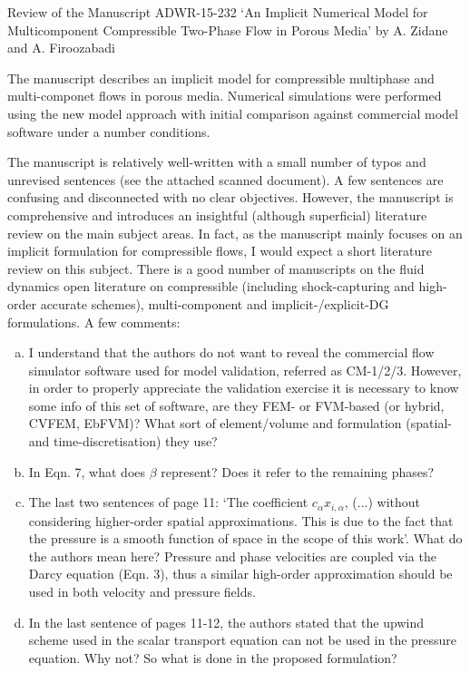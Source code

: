\documentclass[14pt,twoside]{report}
\begin{document}
{{\begin{center}
{\Large Review of the Manuscript ADWR-15-232 `An Implicit Numerical Model for Multicomponent Compressible Two-Phase Flow in Porous Media' by A. Zidane and A. Firoozabadi}
\end{center}

\medskip

The manuscript describes an implicit model for compressible multiphase and multi-componet flows in porous media. Numerical simulations were performed using the new model approach with initial comparison against commercial model software under a number conditions. 

The manuscript is relatively well-written with a small number of typos and unrevised sentences (see the attached scanned document). A few sentences are confusing and disconnected with no clear objectives. However, the manuscript is comprehensive and introduces an insightful (although superficial) literature review on the main subject areas. In fact, as the manuscript mainly focuses on an implicit formulation for compressible flows, I would expect a short literature review on this subject. There is a good number of manuscripts on the fluid dynamics open literature on compressible (including shock-capturing and high-order accurate schemes), multi-component and implicit-/explicit-DG formulations. A few comments:
\begin{enumerate}[(a)] 
%
\item I understand that the authors do not want to reveal the commercial flow simulator software used for model validation, referred as CM-1/2/3. However, in order to properly appreciate the validation exercise it is necessary to know some info of this set of software, are they FEM- or FVM-based (or hybrid, CVFEM, EbFVM)? What sort of element/volume and formulation (spatial- and time-discretisation) they use?
%
\item In Eqn. 7, what does $\beta$ represent? Does it refer to the remaining phases?
%
\item The last two sentences of page 11: `The coefficient $c_{\alpha}x_{i,\alpha}$, (...) without considering higher-order spatial approximations. This is due to the fact that the pressure is a smooth function of space in the scope of this work'. What do the authors mean here? Pressure and phase velocities are coupled via the Darcy equation (Eqn. 3), thus a similar high-order approximation should be used in both velocity and pressure fields.
%
\item In the last sentence of pages 11-12, the authors stated that the upwind scheme used in the scalar transport equation can not be used in the pressure equation. Why not? So what is done in the proposed formulation?

\end{enumerate}}}
\end{document}
